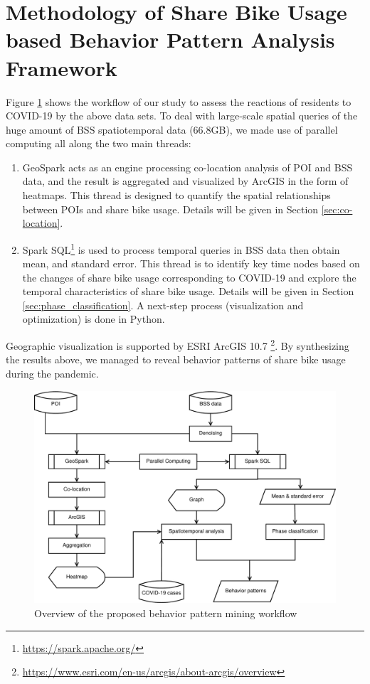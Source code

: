 \documentclass[ijgi,submit,moreauthors,pdftex]{Definitions/mdpi}
\begin{document}
\section{Methodology of Share Bike Usage based Behavior Pattern Analysis Framework}\label{sec:method}

Figure \ref{fig:diagram} shows the workflow of our study to assess the reactions of residents to COVID-19 by the above data sets.
To deal with large-scale spatial queries of the huge amount of BSS spatiotemporal data (66.8GB), we made use of parallel computing all along the two main threads:
\begin{enumerate}
    \item GeoSpark \cite{huang2017geospark} acts as an engine processing co-location analysis of POI and BSS data, and the result is aggregated and visualized by ArcGIS in the form of heatmaps.
    This thread is designed to quantify the spatial relationships between POIs and share bike usage. 
    Details will be given in Section \ref{sec:co-location}.
    \item Spark SQL\footnote{\url{https://spark.apache.org/}} is used to process temporal queries in BSS data then obtain mean, and standard error.
    This thread is to identify key time nodes based on the changes of share bike usage corresponding to COVID-19 and explore the temporal characteristics of share bike usage. 
    Details will be given in Section \ref{sec:phase_classification}.
    A next-step process (visualization and optimization) is done in Python.
\end{enumerate}
Geographic visualization is supported by ESRI ArcGIS 10.7 \footnote{\url{https://www.esri.com/en-us/arcgis/about-arcgis/overview}}.
By synthesizing the results above, we managed to reveal behavior patterns of share bike usage during the pandemic.

\begin{figure}[ht]
    \centering
    \includegraphics[width=.8\textwidth]{diagram.pdf}
    \caption{Overview of the proposed behavior pattern mining workflow}
    \label{fig:diagram}
\end{figure}
\end{document}
